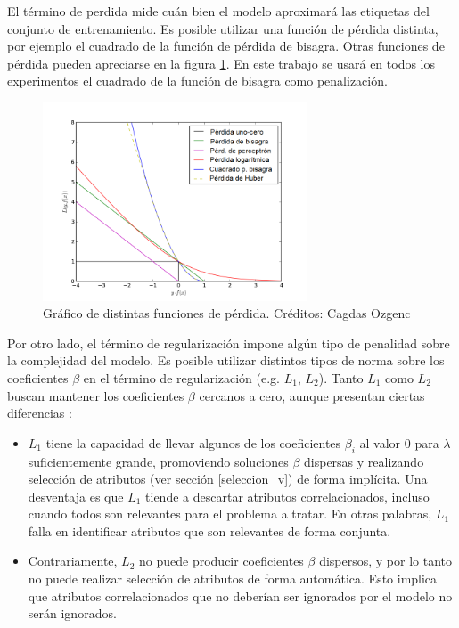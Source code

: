El término de perdida mide cuán bien el modelo aproximará las etiquetas del conjunto de entrenamiento. Es posible utilizar una función de pérdida distinta, por ejemplo el cuadrado de la función de pérdida de bisagra. Otras funciones de pérdida pueden apreciarse en la figura \ref{fig:loss_func}. En este trabajo se usará en todos los experimentos el cuadrado de la función de bisagra como penalización. \\


\begin{figure}[h!]
\begin{center}
  \includegraphics[width=0.7\textwidth]{Kap1/loss_func.png} 
  \end{center}
 \caption{ Gráfico de distintas funciones de pérdida. Créditos: Cagdas Ozgenc }
\label{fig:loss_func}
\end{figure}

Por otro lado, el término de regularización impone algún tipo de penalidad sobre la complejidad del modelo. Es posible utilizar distintos tipos de norma sobre los coeficientes $\beta$ en el término de regularización (e.g. $L_1$, $L_2$). Tanto $L_1$ como $L_2$ buscan mantener los coeficientes $\beta$ cercanos a cero, aunque presentan ciertas diferencias \cite{lopezmartinez2017regularization}:

\begin{itemize}
\item $L_1$ tiene la capacidad de llevar algunos de los coeficientes $\beta_i$ al valor 0 para $\lambda$ suficientemente grande, promoviendo  soluciones $\beta$ dispersas y realizando selección de atributos (ver sección \ref{seleccion_v}) de forma implícita. Una desventaja es que $L_1$ tiende a descartar atributos correlacionados, incluso cuando todos son relevantes para el problema a tratar. En otras palabras, $L_1$ falla en identificar atributos que son relevantes de forma conjunta.
\item Contrariamente, $L_2$ no puede producir coeficientes $\beta$ dispersos, y por lo tanto no puede realizar selección de atributos de forma automática. Esto implica que atributos correlacionados que no deberían ser ignorados por el modelo no serán ignorados.
\end{itemize}

